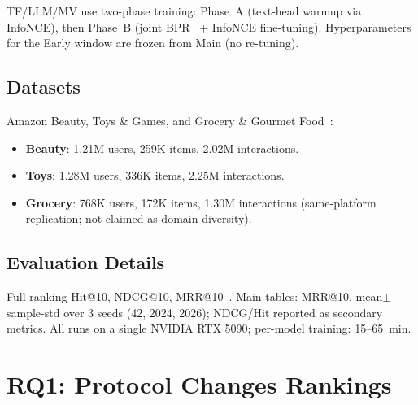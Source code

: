 \documentclass[sigconf,natbib=true,anonymous]{acmart}
\begin{document}
TF/LLM/MV use two-phase training: Phase~A (text-head warmup via InfoNCE), then Phase~B (joint BPR~\cite{rendle2009bpr} + InfoNCE fine-tuning).
Hyperparameters for the Early window are frozen from Main (no re-tuning).

\subsection{Datasets}

Amazon Beauty, Toys \& Games, and Grocery \& Gourmet Food~\cite{mcauley2015amazon,ni2019amazon}:
\begin{itemize}[leftmargin=*,itemsep=1pt]
\item \textbf{Beauty}: 1.21M users, 259K items, 2.02M interactions.
\item \textbf{Toys}: 1.28M users, 336K items, 2.25M interactions.
\item \textbf{Grocery}: 768K users, 172K items, 1.30M interactions (same-platform replication; not claimed as domain diversity).
\end{itemize}

\subsection{Evaluation Details}

Full-ranking Hit@10, NDCG@10, MRR@10~\cite{krichene2020sampledmetrics}.
Main tables: MRR@10, mean$\pm$sample-std over 3 seeds (42, 2024, 2026); NDCG/Hit reported as secondary metrics.
All runs on a single NVIDIA RTX 5090; per-model training: 15--65~min.

\section{RQ1: Protocol Changes Rankings}
\label{sec:rq1}
\end{document}
